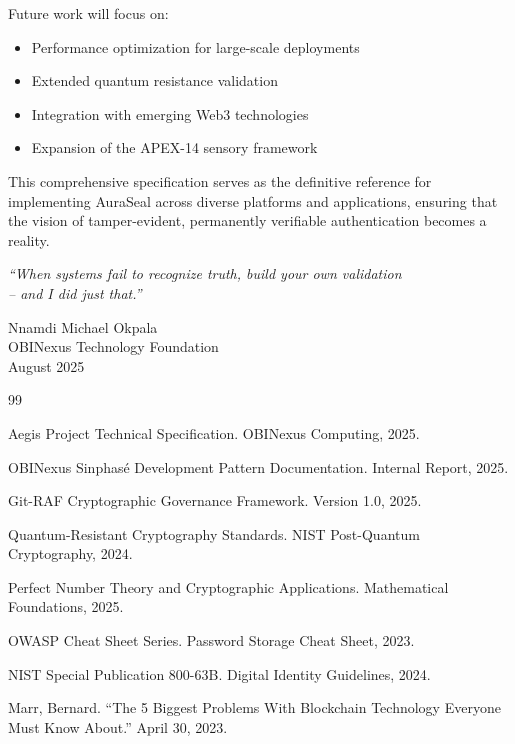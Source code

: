 \documentclass[12pt,a4paper]{report}
\theoremstyle{definition}
\begin{document}
Future work will focus on:
\begin{itemize}
    \item Performance optimization for large-scale deployments
    \item Extended quantum resistance validation
    \item Integration with emerging Web3 technologies
    \item Expansion of the APEX-14 sensory framework
\end{itemize}

This comprehensive specification serves as the definitive reference for implementing AuraSeal across diverse platforms and applications, ensuring that the vision of tamper-evident, permanently verifiable authentication becomes a reality.

\vspace{2cm}

\begin{center}
\textit{``When systems fail to recognize truth, build your own validation \\
-- and I did just that.''}

\vspace{1cm}

Nnamdi Michael Okpala \\
OBINexus Technology Foundation \\
August 2025
\end{center}


\begin{thebibliography}{99}

Aegis Project Technical Specification. OBINexus Computing, 2025.

OBINexus Sinphasé Development Pattern Documentation. Internal Report, 2025.

Git-RAF Cryptographic Governance Framework. Version 1.0, 2025.

Quantum-Resistant Cryptography Standards. NIST Post-Quantum Cryptography, 2024.

Perfect Number Theory and Cryptographic Applications. Mathematical Foundations, 2025.

OWASP Cheat Sheet Series. Password Storage Cheat Sheet, 2023.

NIST Special Publication 800-63B. Digital Identity Guidelines, 2024.

Marr, Bernard. ``The 5 Biggest Problems With Blockchain Technology Everyone Must Know About.'' April 30, 2023.

\end{thebibliography}


\printindex
\end{document}
